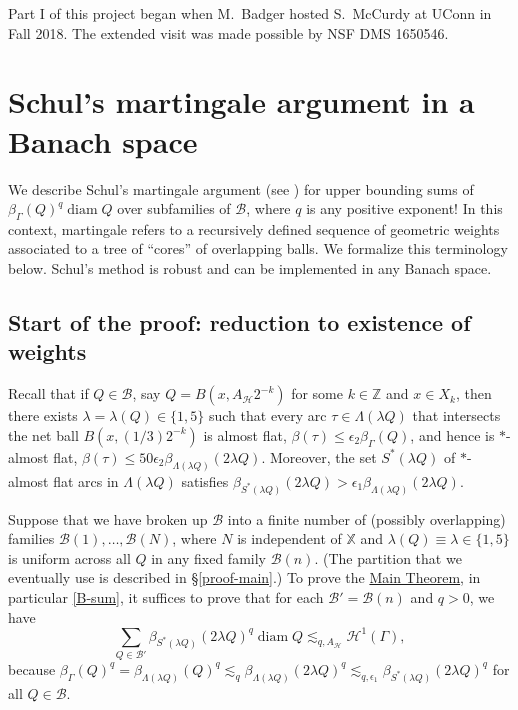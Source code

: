 \documentclass[12pt]{amsart}
\numberwithin{equation}{section}
\theoremstyle{plain}
\theoremstyle{definition}
\def\ZZ{\mathbb{Z}}
\def\XX{{\mathbb{X}}}
\newcommand{\diam}{\mathop\mathrm{diam}\nolimits}
\newcommand{\flatepsilon}{\epsilon_2}
\newcommand{\flatarcsepsilon}{\epsilon_1}
\numberwithin{figure}{section}
\begin{document}
Part I of this project began when M.~Badger hosted S.~McCurdy at UConn in Fall 2018. The extended visit was made possible by NSF DMS 1650546.

\section{Schul's martingale argument in a Banach space}\label{martingale}

We describe Schul's martingale argument (see \cite[\S3.3]{Schul-Hilbert}) for upper bounding sums of $\beta_\Gamma(Q)^q\diam Q$ over subfamilies of $\mathscr{B}$, where $q$ is any positive exponent! In this context, martingale refers to a recursively defined sequence of geometric weights associated to a tree of ``cores'' of overlapping balls. We formalize this terminology below. Schul's method is robust and can be implemented in any Banach space.

\subsection{Start of the proof: reduction to existence of weights}\label{ss:B-decomp}
Recall that if $Q\in\mathscr{B}$, say $Q=B(x,A_\mathscr{H}2^{-k})$ for some $k\in\ZZ$ and $x\in X_k$, then there exists $\lambda=\lambda(Q)\in\{1,5\}$ such that every arc $\tau\in\Lambda(\lambda Q)$ that intersects the net ball $B(x,(1/3)2^{-k})$ is almost flat, $\beta(\tau)\leq \flatepsilon\beta_\Gamma(Q)$, and hence is $*$-almost flat, $\beta(\tau)\leq 50\flatepsilon \beta_{\Lambda(\lambda Q)}(2\lambda Q)$. Moreover, the set $S^*(\lambda Q)$ of $*$-almost flat arcs in $\Lambda(\lambda Q)$ satisfies $\beta_{S^*(\lambda Q)}(2\lambda Q) > \flatarcsepsilon \beta_{\Lambda(\lambda Q)}(2\lambda Q)$.

Suppose that we have broken up $\mathscr{B}$ into a finite number of (possibly overlapping) families $\mathscr{B}(1),\dots,\mathscr{B}(N)$, where $N$ is independent of $\XX$ and $\lambda(Q)\equiv \lambda \in\{1,5\}$ is uniform across all $Q$ in any fixed family $\mathscr{B}(n)$. (The partition that we eventually use is described in \S\ref{proof-main}.) To prove the \hyperref[t:main]{Main Theorem}, in particular \eqref{B-sum}, it suffices to prove that for each $\mathscr{B}'=\mathscr{B}(n)$ and $q>0$, we have \begin{equation}\label{H2-goal} \sum_{Q\in\mathscr{B}'} \beta_{S^*(\lambda Q)}(2\lambda Q)^q\diam Q \lesssim_{q,A_\mathscr{H}} \mathscr{H}^1(\Gamma),\end{equation} because $\beta_\Gamma(Q)^q =\beta_{\Lambda(\lambda Q)}(Q)^q\lesssim_q \beta_{\Lambda(\lambda Q)}(2\lambda Q)^q\lesssim_{q,\epsilon_1} \beta_{S^*(\lambda Q)}(2\lambda Q)^q$ for all $Q\in\mathscr{B}$.
\end{document}
